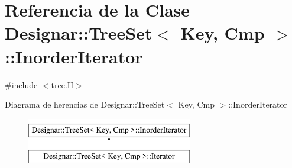 \hypertarget{class_designar_1_1_tree_set_1_1_inorder_iterator}{}\section{Referencia de la Clase Designar\+:\+:Tree\+Set$<$ Key, Cmp $>$\+:\+:Inorder\+Iterator}
\label{class_designar_1_1_tree_set_1_1_inorder_iterator}


{\ttfamily \#include $<$tree.\+H$>$}

Diagrama de herencias de Designar\+:\+:Tree\+Set$<$ Key, Cmp $>$\+:\+:Inorder\+Iterator\begin{figure}[H]
\begin{center}
\leavevmode
\includegraphics[height=2.000000cm]{class_designar_1_1_tree_set_1_1_inorder_iterator}
\end{center}
\end{figure}

